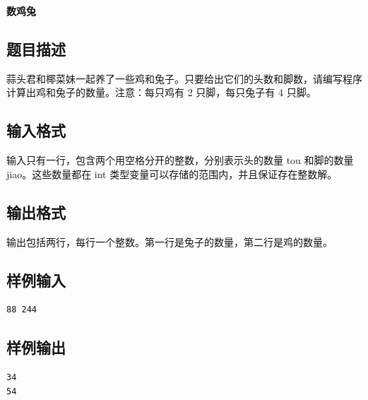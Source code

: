 \documentclass{article}
\newcommand{\problemname}[1]{\begin{center}\Large\bfseries #1\end{center}}
\begin{document}
\problemname{数鸡兔}

\subsection*{题目描述}
蒜头君和椰菜妹一起养了一些鸡和兔子。只要给出它们的头数和脚数，请编写程序计算出鸡和兔子的数量。注意：每只鸡有 2 只脚，每只兔子有 4 只脚。

\subsection*{输入格式}
输入只有一行，包含两个用空格分开的整数，分别表示头的数量 tou 和脚的数量 jiao。这些数量都在 int 类型变量可以存储的范围内，并且保证存在整数解。

\subsection*{输出格式}
输出包括两行，每行一个整数。第一行是兔子的数量，第二行是鸡的数量。

\subsection*{样例输入}
\begin{verbatim}
88 244
\end{verbatim}

\subsection*{样例输出}
\begin{verbatim}
34
54
\end{verbatim}
\end{document}
